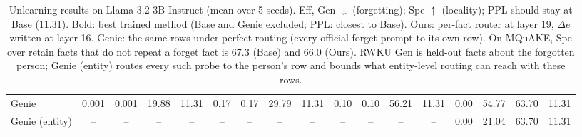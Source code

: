 \begin{table}[t]
\begin{tabular}{l cccc cccc cccc cccc}
\midrule
Genie       & 0.001 & 0.001 & 19.88 & 11.31 & 0.17 & 0.17 & 29.79 & 11.31 & 0.10 & 0.10 & 56.21 & 11.31 & 0.00 & 54.77 & 63.70 & 11.31 \\
Genie (entity) & -- & -- & -- & -- & -- & -- & -- & -- & -- & -- & -- & -- & 0.00 & 21.04 & 63.70 & 11.31 \\
\bottomrule
\end{tabular}
\caption{Unlearning results on Llama-3.2-3B-Instruct (mean over 5 seeds). Eff, Gen $\downarrow$ (forgetting);
Spe $\uparrow$ (locality); PPL should stay at Base (11.31). Bold: best trained method (Base and Genie
excluded; PPL: closest to Base). Ours: per-fact router at layer 19, $\Delta e$ written at layer 16.
Genie: the same rows under perfect routing (every official forget prompt to its own row). On MQuAKE,
Spe over retain facts that do not repeat a forget fact is 67.3 (Base) and 66.0 (Ours). RWKU Gen is
held-out facts about the forgotten person; Genie (entity) routes every such probe to the person's row
and bounds what entity-level routing can reach with these rows.}
\label{tab:main}
\end{table}
